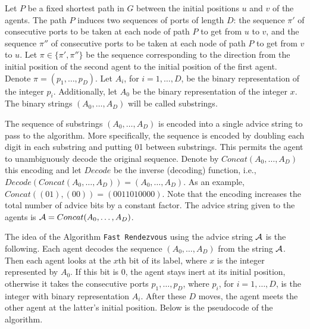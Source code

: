 \documentclass{llncs}
\begin{document}
Let $P$ be a fixed shortest path in $G$ between the initial positions $u$ and $v$ of the agents.
The path $P$ induces two sequences of ports of length $D$: the sequence $\pi'$ of consecutive ports to
be taken at each node of path $P$ to get from $u$ to $v$, and the sequence $\pi''$ of consecutive ports to
be taken at each node of path $P$ to get from $v$ to $u$. Let $\pi\in \{\pi',\pi''\}$ be the sequence 
corresponding to the direction from the initial position of the second agent to the initial position of the first agent.
Denote $\pi=(p_1,\dots,p_D)$. Let $A_i$, for $i=1,\dots, D$, be the binary representation of the integer $p_i$. Additionally,
let $A_0$ be the binary representation of the integer $x$. The binary strings  $(A_0,\ldots,A_{D})$ will be called substrings.
 
The sequence of substrings $(A_0,\ldots,A_{D})$ is encoded into a single advice string to pass to the algorithm. More specifically, the sequence is encoded by doubling each digit in each substring and putting 01 between substrings. This permits the agent to unambiguously decode the original sequence. Denote by $Concat(A_0,\ldots,A_{D})$ this encoding and let $Decode$ be the inverse (decoding) function, i.e., $Decode(Concat(A_0,\ldots,A_{D}))=(A_0,\ldots,A_{D})$.
As an example, $Concat((01),(00)) = (0011010000)$. Note that the encoding increases the total number of advice bits by a constant factor. The advice string 
given to the agents is ${\cal A}= Concat(A_0,\ldots,A_{D})$.



The idea of the Algorithm {\tt Fast Rendezvous} using the advice string $\cal A$  is the following. Each agent decodes the sequence $(A_0,\ldots,A_{D})$ from the string
$\cal A$. Then each agent looks at the $x$th bit of its label, where $x$ is the integer represented by $A_0$. If this bit is 0, the agent stays inert at its initial position, otherwise it takes the 
consecutive ports $p_1,\dots,p_D$, where $p_i$, for $i=1,\dots, D$, is the integer with binary representation $A_i$. After these $D$ moves, the agent meets the other agent
at the latter's initial position. Below is the pseudocode of the algorithm.
\end{document}
